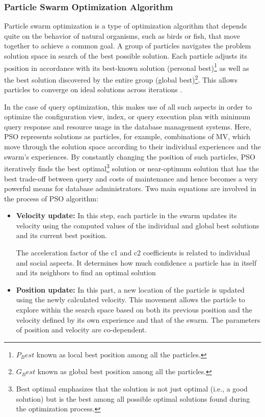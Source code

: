 \subsubsection{Particle Swarm Optimization Algorithm}
\label{sec:PSO}
Particle swarm optimization is a type of optimization algorithm that depends quite on the behavior of natural organisms, such as birds or fish, that move together to achieve a common goal. A group of particles navigates the problem solution space in search of the best possible solution. Each particle adjusts its position in accordance with its best-known solution (personal best)\footnote{$P_Best$ known as local best position among all the particles.} as well as the best solution discovered by the entire group (global best)\footnote{$G_Best$ known as global best position among all the particles.}. This allows particles to converge on ideal solutions across iterations \cite{subhasis-2023}.\vspace{.4cm}

 In the case of query optimization, this makes use of all such aspects in order to optimize the configuration view, index, or query execution plan with minimum query response and resource usage in the database management systems. Here, PSO represents solutions as particles, for example, combinations of MV, which move through the solution space according to their individual experiences and the swarm's experiences. By constantly changing the position of such particles, PSO iteratively finds the best optimal\footnote{Best optimal emphasizes that the solution is not just optimal (i.e., a good solution) but is the best among all possible optimal solutions found during the optimization process.} solution or near-optimum solution that has the best trade-off between query and costs of maintenance and hence becomes a very powerful means for database administrators. Two main equations are involved in the process of PSO algorithm:\vspace{.4cm}
\begin{itemize}
    \item \textbf{Velocity update:} In this step, each particle in the swarm updates its velocity using the computed values of the individual and global best solutions and its current best position. 


    The acceleration factor of the c1 and c2 coefficients is related to individual and social aspects. It determines how much confidence a particle has in itself and its neighbors to find an optimal solution \cite{baeldung2024pso}
    
    \item \textbf{Position update:} In this part, a new location of the particle is updated using the newly calculated velocity. This movement allows the particle to explore within the search space based on both its previous position and the velocity defined by its own experience and that of the swarm. The parameters of position and velocity are co-dependent.
    
    

\end{itemize} 

